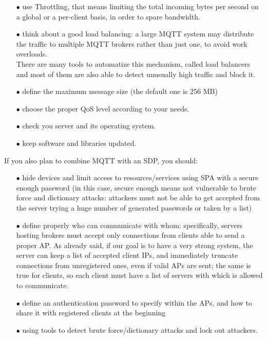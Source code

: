 \documentclass[12pt]{report}
\begin{document}
{{\begin{itemize}
\item[$\bullet$] use Throttling, that means limiting the total incoming bytes per second on a global or a per-client basis, in order to spare bandwidth.
\item[$\bullet$] think about a good load balancing: a large MQTT system may distribute the traffic to multiple MQTT brokers rather than just one, to avoid work overloads.\\
There are many tools to automatize this mechanism, called load balancers and most of them are also able to detect unusually high traffic and block it.
\item[$\bullet$] define the maximum message size (the default one is 256 MB)
\item[$\bullet$] choose the proper QoS level according to your needs.
\item[$\bullet$] check you server and its operating system.
\item[$\bullet$] keep software and libraries updated.\\
\end{itemize}

If you also plan to combine MQTT with an SDP, you should:

\begin{itemize}
\setlength{\itemindent}{+4mm}
\item[$\bullet$] hide devices and limit access to resources/services using SPA with a secure enough password (in this case, secure enough means not vulnerable to brute force and dictionary attacks: attackers must not be able to get accepted from the server trying a huge number of generated passwords or taken by a list)
\item[$\bullet$] define properly who can communicate with whom: specifically, servers hosting brokers must accept only connections from clients able to send a proper AP. As already said, if our goal is to have a very strong system, the server can keep a list of accepted client IPs, and immediately truncate connections from unregistered ones, even if valid APs are sent; the same is true for clients, so each client must have a list of servers with which is allowed to communicate.
\item[$\bullet$] define an authentication password to specify within the APs, and how to share it with registered clients at the beginning
\item[$\bullet$] using tools to detect brute force/dictionary attacks and lock out attackers.
\end{itemize}

}}
\end{document}
